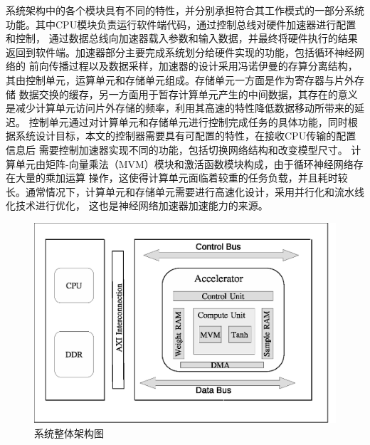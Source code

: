 系统架构中的各个模块具有不同的特性，并分别承担符合其工作模式的一部分系统功能。其中CPU模块负责运行软件端代码，通过控制总线对硬件加速器进行配置和控制，
通过数据总线向加速器载入参数和输入数据，并最终将硬件执行的结果返回到软件端。加速器部分主要完成系统划分给硬件实现的功能，包括循环神经网络的
前向传播过程以及数据采样，加速器的设计采用冯诺伊曼的存算分离结构，其由控制单元，运算单元和存储单元组成。存储单元一方面是作为寄存器与片外存储
数据交换的缓存，另一方面用于暂存计算单元产生的中间数据，其存在的意义是减少计算单元访问片外存储的频率，利用其高速的特性降低数据移动所带来的延迟。
控制单元通过对计算单元和存储单元进行控制完成任务的具体功能，同时根据系统设计目标，本文的控制器需要具有可配置的特性，在接收CPU传输的配置信息后
需要控制加速器实现不同的功能，包括切换网络结构和改变模型尺寸。 计算单元由矩阵-向量乘法（MVM）模块和激活函数模块构成，由于循环神经网络存在大量的乘加运算
操作，这使得计算单元面临着较重的任务负载，并且耗时较长。通常情况下，计算单元和存储单元需要进行高速化设计，采用并行化和流水线化技术进行优化，
这也是神经网络加速器加速能力的来源。
\begin{figure}
	\centering
	\includegraphics[width=0.8\columnwidth]{exp/fig_systemArch2.eps}
	\caption{系统整体架构图}
	\label{fig:sysArch}
\end{figure}

